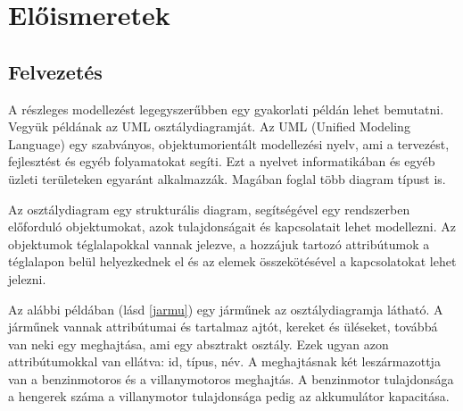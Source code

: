 \chapter{Előismeretek}

\section{Felvezetés}

A részleges modellezést legegyszerűbben egy gyakorlati példán lehet bemutatni. Vegyük példának az UML \cite{UML} osztálydiagramját. Az UML (Unified Modeling Language) egy szabványos, objektumorientált modellezési nyelv, ami a tervezést, fejlesztést és egyéb folyamatokat segíti. Ezt a nyelvet informatikában és egyéb üzleti területeken egyaránt alkalmazzák. Magában foglal több diagram típust is.
\par
Az osztálydiagram egy strukturális diagram, segítségével egy rendszerben előforduló objektumokat, azok tulajdonságait és kapcsolatait lehet modellezni. Az objektumok téglalapokkal vannak jelezve, a hozzájuk tartozó attribútumok a téglalapon belül helyezkednek el és az elemek összekötésével a kapcsolatokat lehet jelezni. 
\par
Az alábbi példában (lásd \autoref{jarmu}) egy járműnek az osztálydiagramja látható. A járműnek vannak attribútumai és tartalmaz ajtót, kereket és üléseket, továbbá van neki egy meghajtása, ami egy absztrakt osztály. Ezek ugyan azon attribútumokkal van ellátva: id, típus, név. A meghajtásnak két leszármazottja van a benzinmotoros és a villanymotoros meghajtás. A benzinmotor tulajdonsága a hengerek száma a villanymotor tulajdonsága pedig az akkumulátor kapacitása.

